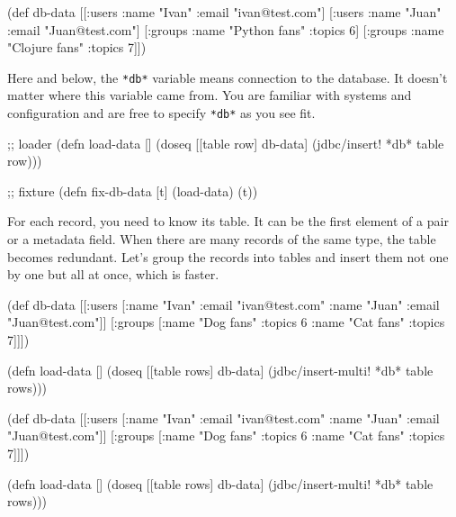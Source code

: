\begin{english}
  \begin{clojure}
(def db-data
  [[:users {:name "Ivan" :email "ivan@test.com"}]
   [:users {:name "Juan" :email "Juan@test.com"}]
   [:groups {:name "Python fans" :topics 6}]
   [:groups {:name "Clojure fans" :topics 7}]])
  \end{clojure}
\end{english}

\fi


Here and below, the \verb|*db*| variable means connection to the database. It doesn't matter where this variable came from. You are familiar with systems and configuration and are free to specify \verb|*db*| as you see fit.

\begin{english}
  \begin{clojure}
;; loader
(defn load-data []
  (doseq [[table row] db-data]
    (jdbc/insert! *db* table row)))

;; fixture
(defn fix-db-data [t]
  (load-data)
  (t))
  \end{clojure}
\end{english}

For each record, you need to know its table. It can be the first element of a  pair or a metadata field. When there are many records of the same type, the table becomes redundant. Let's group the records into tables and insert them not one by one but all at once, which is faster.


\ifnarrow

\begin{english}
  \begin{clojure}
(def db-data
  [[:users [{:name "Ivan"
             :email "ivan@test.com"}
            {:name "Juan"
             :email "Juan@test.com"}]]
  [:groups [{:name "Dog fans"
             :topics 6}
            {:name "Cat fans"
             :topics 7}]]])

(defn load-data []
 (doseq [[table rows] db-data]
  (jdbc/insert-multi! *db* table rows)))
  \end{clojure}
\end{english}

\else

\begin{english}
  \begin{clojure}
(def db-data
  [[:users [{:name "Ivan" :email "ivan@test.com"}
            {:name "Juan" :email "Juan@test.com"}]]
   [:groups [{:name "Dog fans" :topics 6}
             {:name "Cat fans" :topics 7}]]])

(defn load-data []
  (doseq [[table rows] db-data]
    (jdbc/insert-multi! *db* table rows)))
  \end{clojure}
\end{english}

